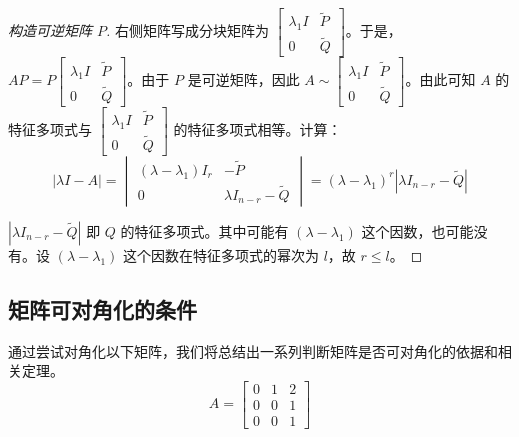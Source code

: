 \begin{proof}[构造可逆矩阵 $P$]
	右侧矩阵写成分块矩阵为 $\begin{bmatrix} \lambda_1 I & \tilde P \\ 0 & \tilde Q \end{bmatrix}$。于是，$AP = P \begin{bmatrix} \lambda_1 I & \tilde P \\ 0 & \tilde Q \end{bmatrix}$。由于 $P$ 是可逆矩阵，因此 $A \sim \begin{bmatrix} \lambda_1 I & \tilde P \\ 0 & \tilde Q \end{bmatrix}$。由此可知 $A$ 的特征多项式与 $\begin{bmatrix} \lambda_1 I & \tilde P \\ 0 & \tilde Q \end{bmatrix}$ 的特征多项式相等。计算：
	$$
	|\lambda I - A| =
	\begin{vmatrix}
	(\lambda - \lambda_1) I_{r} & - \tilde P
	\\
	0 & \lambda I_{n - r} - \tilde Q
	\end{vmatrix}
	=
	(\lambda - \lambda_1)^{r} |\lambda I_{n - r} - \tilde Q|
	$$

	$|\lambda I_{n - r} - \tilde Q|$ 即 $Q$ 的特征多项式。其中可能有 $(\lambda - \lambda_1)$ 这个因数，也可能没有。设 $(\lambda - \lambda_1)$ 这个因数在特征多项式的幂次为 $l$，故 $r \le l$。
\end{proof}

\subsection{矩阵可对角化的条件}

通过尝试对角化以下矩阵，我们将总结出一系列判断矩阵是否可对角化的依据和相关定理。
$$
A = \begin{bmatrix} 0 & 1 & 2 \\ 0 & 0 & 1 \\ 0 & 0 & 1 \end{bmatrix}
$$

